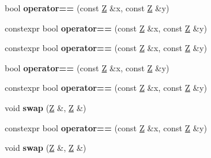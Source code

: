 \begin{DoxyCompactItemize}
bool {\bfseries operator==} (const \mbox{\hyperlink{struct_z}{Z}} \&x, const \mbox{\hyperlink{struct_z}{Z}} \&y)
\item 
\mbox{\label{struct_z_ac0a03efad45091ee639b923e06ee3afd}} 
constexpr bool {\bfseries operator==} (const \mbox{\hyperlink{struct_z}{Z}} \&x, const \mbox{\hyperlink{struct_z}{Z}} \&y)
\item 
\mbox{\label{struct_z_ac0a03efad45091ee639b923e06ee3afd}} 
constexpr bool {\bfseries operator==} (const \mbox{\hyperlink{struct_z}{Z}} \&x, const \mbox{\hyperlink{struct_z}{Z}} \&y)
\item 
\mbox{\label{struct_z_a9fd020f7e3f83a01d3d1310aa4f27d0d}} 
bool {\bfseries operator==} (const \mbox{\hyperlink{struct_z}{Z}} \&x, const \mbox{\hyperlink{struct_z}{Z}} \&y)
\item 
\mbox{\label{struct_z_ac0a03efad45091ee639b923e06ee3afd}} 
constexpr bool {\bfseries operator==} (const \mbox{\hyperlink{struct_z}{Z}} \&x, const \mbox{\hyperlink{struct_z}{Z}} \&y)
\item 
\mbox{\label{struct_z_a15c146725876915cf3a93c9ad062a3e4}} 
void {\bfseries swap} (\mbox{\hyperlink{struct_z}{Z}} \&, \mbox{\hyperlink{struct_z}{Z}} \&)
\item 
\mbox{\label{struct_z_ac0a03efad45091ee639b923e06ee3afd}} 
constexpr bool {\bfseries operator==} (const \mbox{\hyperlink{struct_z}{Z}} \&x, const \mbox{\hyperlink{struct_z}{Z}} \&y)
\item 
\mbox{\label{struct_z_a15c146725876915cf3a93c9ad062a3e4}} 
void {\bfseries swap} (\mbox{\hyperlink{struct_z}{Z}} \&, \mbox{\hyperlink{struct_z}{Z}} \&)
\end{DoxyCompactItemize}



